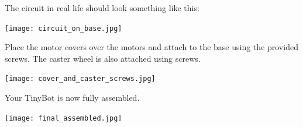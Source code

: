\documentclass[../TinyBot.tex]{subfiles}
\begin{document}
The circuit in real life should look something like this:

\begin{center}
    \texttt{[image: circuit\_on\_base.jpg]}
\end{center}


Place the motor covers over the motors and attach to the base using the provided screws. The caster wheel is also attached using screws. 

\begin{center}
    \texttt{[image: cover\_and\_caster\_screws.jpg]}
\end{center}

Your TinyBot is now fully assembled.
\begin{center}
    \texttt{[image: final\_assembled.jpg]}
\end{center}
\end{document}

